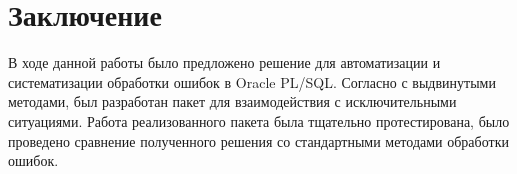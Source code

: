 \chapter*{Заключение} \label{ch-conclusion}


В ходе данной работы было предложено решение для автоматизации и систематизации обработки ошибок в Oracle PL/SQL. Согласно с выдвинутыми методами, был разработан пакет для взаимодействия с исключительными ситуациями. 
Работа реализованного пакета была тщательно протестирована, было проведено сравнение полученного решения со стандартными методами обработки ошибок. 

